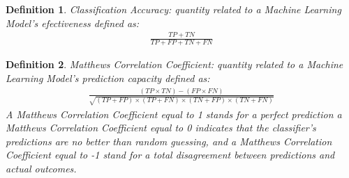 \documentclass[12pt,letterpaper]{article}
\newtheorem{definition}{Definition}
\begin{document}
\begin{multicols}{2}
\begin{definition}
Classification Accuracy: quantity related to a Machine Learning Model's efectiveness defined as:
\begin{align}
\frac{TP+TN}{TP+FP+TN+FN}
\end{align}
\end{definition}

\begin{definition}
Matthews Correlation Coefficient: quantity related to a Machine Learning Model's prediction capacity defined as:
{\scriptsize
\begin{align}
\frac{(TP\times TN)-(FP\times FN)}{\sqrt{(TP+FP)\times(TP+FN)\times(TN+FP)\times(TN+FN)}}
\end{align}
}
A Matthews Correlation Coefficient equal to 1 stands for a perfect prediction a Matthews Correlation Coefficient equal to 0 indicates that the classifier’s predictions are no better than random guessing, and a Matthews Correlation Coefficient equal to -1 stand for a total disagreement between predictions and actual outcomes.
\end{definition}

\end{multicols}
\newpage
\end{document}
